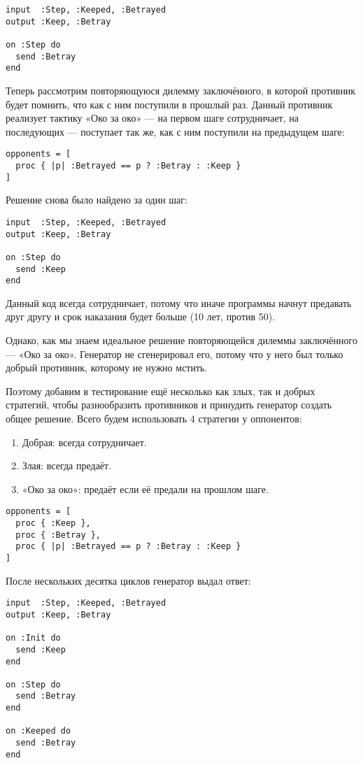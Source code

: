 \documentclass[utf8,a5paper,portrait,10pt,twoside]{eskdtext}
\begin{document}
\begin{verbatim}
input  :Step, :Keeped, :Betrayed
output :Keep, :Betray

on :Step do
  send :Betray
end
\end{verbatim}

Теперь рассмотрим повторяющуюся дилемму заключённого, в которой противник будет
помнить, что как с ним поступили в прошлый раз. Данный противник реализует
тактику «Око за око» — на первом шаге сотрудничает, на последующих — поступает
так же, как с ним поступили на предыдущем шаге:

\begin{verbatim}
opponents = [
  proc { |p| :Betrayed == p ? :Betray : :Keep }
]
\end{verbatim}

Решение снова было найдено за один шаг:

\begin{verbatim}
input  :Step, :Keeped, :Betrayed
output :Keep, :Betray

on :Step do
  send :Keep
end
\end{verbatim}

Данный код всегда сотрудничает, потому что иначе программы начнут предавать
друг другу и срок наказания будет больше (10 лет, против 50).

Однако, как мы знаем идеальное решение повторяющейся дилеммы заключённого —
«Око за око». Генератор не сгенерировал его, потому что у него был только
добрый противник, которому не нужно мстить.

Поэтому добавим в тестирование ещё несколько как злых, так и добрых стратегий,
чтобы разнообразить противников и принудить генератор создать общее решение.
Всего будем использовать 4 стратегии у оппонентов:

\begin{enumerate}
  \item Добрая: всегда сотрудничает.
  \item Злая: всегда предаёт.
  \item «Око за око»: предаёт если её предали на прошлом шаге.
\end{enumerate}

\begin{verbatim}
opponents = [
  proc { :Keep },
  proc { :Betray },
  proc { |p| :Betrayed == p ? :Betray : :Keep }
]
\end{verbatim}

После нескольких десятка циклов генератор выдал ответ:
\begin{verbatim}
input  :Step, :Keeped, :Betrayed
output :Keep, :Betray

on :Init do
  send :Keep
end

on :Step do
  send :Betray
end

on :Keeped do
  send :Betray
end
\end{verbatim}
\end{document}
